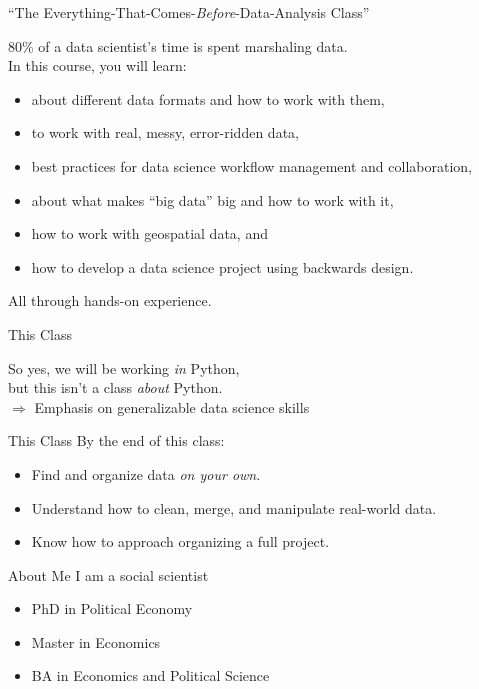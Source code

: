 \documentclass[11pt]{beamer}
\begin{document}
\begin{frame}[c]{``The Everything-That-Comes-\emph{Before}-Data-Analysis Class''}

\pause \alert{80\%} of a data scientist's time is spent marshaling data. \\

\pause In this course, you will learn:
\begin{itemize}
	\pause \item about different data formats and how to work with them,
	\pause \item to work with real, messy, error-ridden data,
	\pause \item best practices for data science workflow management and collaboration,
	\pause \item about what makes ``big data'' big and how to work with it,
	\pause \item how to work with geospatial data, and
	\pause \item how to develop a data science project using backwards design.
\end{itemize}
\pause \alert{All} through hands-on experience.
\end{frame}

\begin{frame}[c]{This Class}

	So yes, we will be working \emph{in} Python, \\ 
\pause but this isn't a class \emph{about} Python. \\
\pause $\Rightarrow$ Emphasis on generalizable data science skills

\end{frame}

\begin{frame}[c]{This Class}
By the end of this class:
\begin{itemize}
	\pause \item Find and organize data \emph{on your own}.
	\pause \item Understand how to clean, merge, and manipulate real-world data.
	\pause \item Know how to approach organizing a full project.
\end{itemize}
\end{frame}


\begin{frame}[c]{About Me}
	I am a social scientist \\
	\vspace{0.5cm}
	\begin{itemize}
		\pause \item PhD in Political Economy
		\pause \item Master in Economics
		\pause \item BA in Economics and Political Science
	\end{itemize}
\end{frame}
\end{document}
